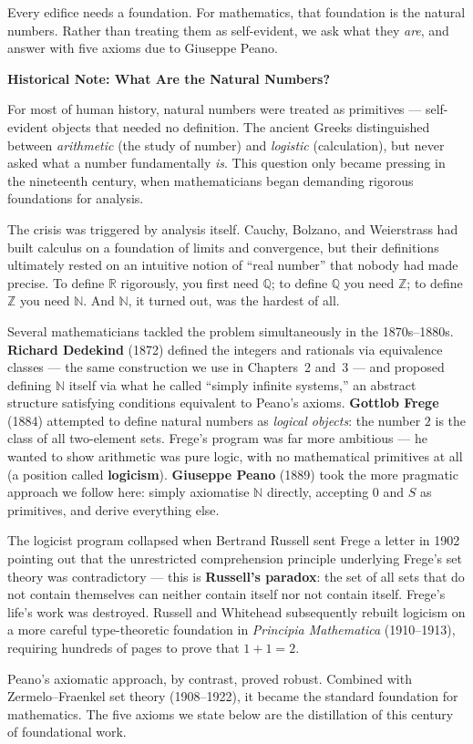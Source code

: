 \documentclass[12pt, openany]{book}
\theoremstyle{plain}
\theoremstyle{definition}
\theoremstyle{remark}
\newcommand{\N}{\mathbb{N}}
\newcommand{\Z}{\mathbb{Z}}
\newcommand{\Q}{\mathbb{Q}}
\newcommand{\R}{\mathbb{R}}
\begin{document}
Every edifice needs a foundation. For mathematics, that foundation is the natural numbers. Rather than treating them as self-evident, we ask what they \emph{are}, and answer with five axioms due to Giuseppe Peano.

\begin{remarkbox}
\textbf{Historical Note: What Are the Natural Numbers?}

For most of human history, natural numbers were treated as primitives --- self-evident objects that needed no definition. The ancient Greeks distinguished between \emph{arithmetic} (the study of number) and \emph{logistic} (calculation), but never asked what a number fundamentally \emph{is}. This question only became pressing in the nineteenth century, when mathematicians began demanding rigorous foundations for analysis.

The crisis was triggered by analysis itself. Cauchy, Bolzano, and Weierstrass had built calculus on a foundation of limits and convergence, but their definitions ultimately rested on an intuitive notion of ``real number'' that nobody had made precise. To define $\R$ rigorously, you first need $\Q$; to define $\Q$ you need $\Z$; to define $\Z$ you need $\N$. And $\N$, it turned out, was the hardest of all.

Several mathematicians tackled the problem simultaneously in the 1870s--1880s. \textbf{Richard Dedekind} (1872) defined the integers and rationals via equivalence classes --- the same construction we use in Chapters~2 and~3 --- and proposed defining $\N$ itself via what he called ``simply infinite systems,'' an abstract structure satisfying conditions equivalent to Peano's axioms. \textbf{Gottlob Frege} (1884) attempted to define natural numbers as \emph{logical objects}: the number $2$ is the class of all two-element sets. Frege's program was far more ambitious --- he wanted to show arithmetic was pure logic, with no mathematical primitives at all (a position called \textbf{logicism}). \textbf{Giuseppe Peano} (1889) took the more pragmatic approach we follow here: simply axiomatise $\N$ directly, accepting $0$ and $S$ as primitives, and derive everything else.

The logicist program collapsed when Bertrand Russell sent Frege a letter in 1902 pointing out that the unrestricted comprehension principle underlying Frege's set theory was contradictory --- this is \textbf{Russell's paradox}: the set of all sets that do not contain themselves can neither contain itself nor not contain itself. Frege's life's work was destroyed. Russell and Whitehead subsequently rebuilt logicism on a more careful type-theoretic foundation in \emph{Principia Mathematica} (1910--1913), requiring hundreds of pages to prove that $1 + 1 = 2$.

Peano's axiomatic approach, by contrast, proved robust. Combined with Zermelo--Fraenkel set theory (1908--1922), it became the standard foundation for mathematics. The five axioms we state below are the distillation of this century of foundational work.
\end{remarkbox}
\color{black}
\end{document}
